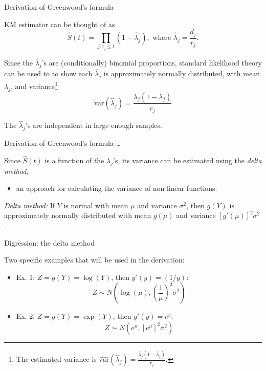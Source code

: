 \documentclass[ignorenonframetext,]{beamer}
\providecommand{\tightlist}{%
  \setlength{\itemsep}{0pt}\setlength{\parskip}{0pt}}
\begin{document}
\begin{frame}{%
\protect\hypertarget{derivation-of-greenwoods-formula}{%
Derivation of Greenwood’s formula}}

KM estimator can be thought of as \[  
\widehat{S}(t) = \prod_{j: \tau_j \leq t} (1-\widehat{\lambda}_j), \text{ where } \widehat{\lambda}_j = \frac{d_j}{r_j}.
\]

Since the \(\widehat\lambda_j\)’s are (conditionally) binomial
proportions, standard likelihood theory can be used to to show each
\(\widehat{\lambda}_j\) is approximately normally distributed, with mean
\(\lambda_j\), and
variance\footnote{The estimated variance is $\widehat{\text{var}}(\widehat{\lambda}_j) = \frac{\widehat{\lambda}_j
(1-\widehat{\lambda}_j)}{r_j}$.} \[
\text{var}(\widehat{\lambda}_j) 
= \frac{{\lambda}_j (1-{\lambda}_j)}{r_j}
\]

The \(\widehat\lambda_j\)’s are independent in large enough samples.

\end{frame}

\begin{frame}{%
\protect\hypertarget{derivation-of-greenwoods-formula-1}{%
Derivation of Greenwood’s formula \ldots}}

Since \(\widehat{S}(t)\) is a function of the \(\lambda_j\)’s, its
variance can be estimated using the \emph{delta method},

\begin{itemize}
\tightlist
\item
  an approach for calculating the variance of non-linear functions.
\end{itemize}

\emph{Delta method:} If \(Y\) is normal with mean \(\mu\) and variance
\(\sigma^2\), then \(g(Y)\) is approximately normally distributed with
mean \(g(\mu)\) and variance \([g'(\mu)]^2 \sigma^2\).

\end{frame}

\begin{frame}{%
\protect\hypertarget{digression-the-delta-method}{%
Digression: the delta method}}

Two specific examples that will be used in the derivation:

\begin{itemize}
\item
  Ex. 1: \(Z = g(Y)= \log(Y)\), then \(g'(y)=(1/y)\): \[
  Z \sim N\left(\log(\mu),\left(\frac{1}{\mu}\right)^2 \sigma^2\right)
  \]
\item
  Ex. 2: \(Z = g(Y)= \exp(Y)\), then \(g'(y)=e^y\): \[
  Z \sim N\left(e^{\mu}, [e^{\mu}]^2 \sigma^2\right)
  \]
\end{itemize}

\end{frame}
\end{document}
